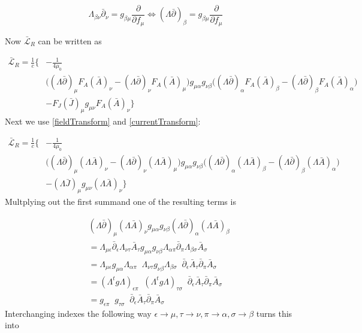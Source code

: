 \documentclass{article}
\begin{document}
\begin{equation} \label{transformPartial}
    \Lambda_{\beta\nu} \bar{\partial}_\nu = g_{\beta\mu} \frac{\partial}{\partial f_\mu}
    \iff (\Lambda \bar{\partial})_\beta = g_{\beta\mu} \frac{\partial}{\partial f_\mu}
\end{equation}



Now $\bar{\mathcal{L}}_R$ can be written as

\begin{align}
    \bar{\mathcal{L}}_R = \frac{1}{c} \bigg\{ & -\frac{1}{4\mu_0}  \nonumber \\
    & \bigg((\Lambda \bar{\partial})_\mu F_A(\bar{A})_\nu - (\Lambda \bar{\partial})_\nu F_A(\bar{A})_\mu \bigg)
    g_{\mu\alpha} g_{\nu\beta}
    \bigg((\Lambda \bar{\partial})_\alpha F_A(\bar{A})_\beta - (\Lambda \bar{\partial})_\beta F_A(\bar{A})_\alpha \bigg) \nonumber \\
    & - F_J(\bar{J})_\mu g_{\mu\nu} F_A(\bar{A})_\nu \bigg\}
\end{align}
Next we use \ref{fieldTransform} and \ref{currentTransform}:

\begin{align} \label{LagrangeTransformed2}
    \bar{\mathcal{L}}_R = \frac{1}{c} \bigg\{ & -\frac{1}{4\mu_0}  \nonumber \\
    & \bigg((\Lambda \bar{\partial})_\mu (\Lambda\bar{A})_\nu - (\Lambda \bar{\partial})_\nu (\Lambda \bar{A})_\mu \bigg)
    g_{\mu\alpha} g_{\nu\beta}
    \bigg((\Lambda \bar{\partial})_\alpha (\Lambda \bar{A})_\beta - (\Lambda \bar{\partial})_\beta (\Lambda \bar{A})_\alpha \bigg) \nonumber \\
    & - (\Lambda \bar{J})_\mu g_{\mu\nu} (\Lambda \bar{A})_\nu \bigg\}
\end{align}
Multplying out the first summand one of the resulting terms is

\begin{align}
    & (\Lambda \bar{\partial})_\mu (\Lambda\bar{A})_\nu g_{\mu\alpha} g_{\nu\beta} (\Lambda \bar{\partial})_\alpha (\Lambda \bar{A})_\beta \nonumber
    \\
    & =
      \Lambda_{\mu\epsilon} \bar{\partial}_\epsilon \Lambda_{\nu\tau} \bar{A}_\tau
      g_{\mu\alpha} g_{\nu\beta}
      \Lambda_{\alpha\pi} \bar{\partial}_\pi \Lambda_{\beta\sigma} \bar{A}_\sigma \nonumber
    \\
    & =
      \Lambda_{\mu\epsilon} g_{\mu\alpha} \Lambda_{\alpha\pi} \;\;
      \Lambda_{\nu\tau} g_{\nu\beta} \Lambda_{\beta\sigma} \;\;
      \bar{\partial}_\epsilon \bar{A}_\tau \bar{\partial}_\pi \bar{A}_\sigma \nonumber
    \\
      & =
      (\Lambda^tg\Lambda)_{\epsilon\pi} \;\; (\Lambda^tg\Lambda)_{\tau\sigma} \;\;
      \bar{\partial}_\epsilon \bar{A}_\tau \bar{\partial}_\pi \bar{A}_\sigma \nonumber
    \\
    & = g_{\epsilon\pi} \;\; g_{\tau\sigma} \;\; \bar{\partial}_\epsilon \bar{A}_\tau \bar{\partial}_\pi \bar{A}_\sigma
\end{align}
Interchanging indexes the following way $\epsilon \rightarrow \mu, \tau \rightarrow \nu, \pi \rightarrow \alpha, \sigma \rightarrow \beta$ turns this into
\end{document}
